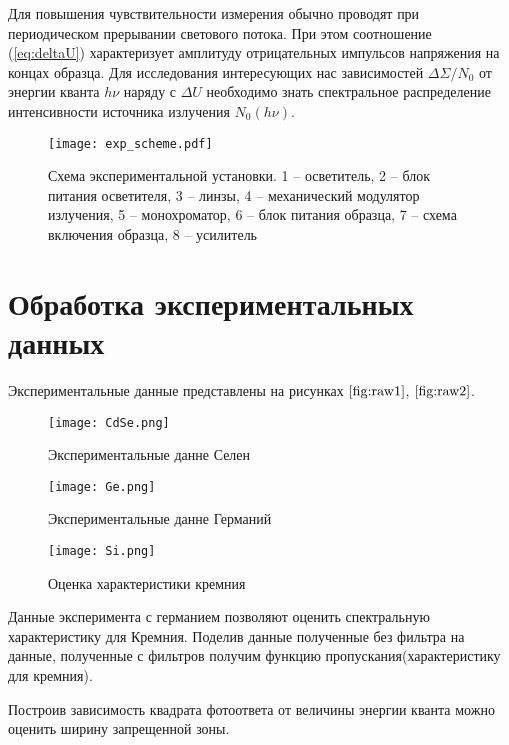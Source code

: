 \documentclass[a4paper, 14pt]{article}
\begin{document}
    Для повышения чувствительности измерения обычно проводят при периодическом прерывании светового потока. При этом соотношение (\ref{eq:deltaU}) характеризует амплитуду отрицательных импульсов напряжения на концах образца. Для исследования интересующих нас зависимостей $\Delta\Sigma/N_0$ от энергии кванта $h\nu$ наряду с $\Delta U$ необходимо знать спектральное распределение интенсивности источника излучения $N_0(h\nu)$.
    \begin{figure}[!htb]
        \centering
        \texttt{[image: exp\_scheme.pdf]}
        \caption{Схема экспериментальной установки. 1 -- осветитель, 2 -- блок питания осветителя, 3 -- линзы, 4 -- механический модулятор излучения, 5 -- монохроматор, 6 -- блок питания образца, 7 -- схема включения образца, 8 -- усилитель}
    \end{figure}

\newpage
\section*{\textcolor{header}{Обработка экспериментальных данных}}

Экспериментальные данные представлены на рисунках $\ref{fig:raw1}$, $\ref{fig:raw2}$.
\begin{figure}[htbp]
    \centering
    \texttt{[image: CdSe.png]}


    \caption{Экспериментальные данне Селен}
    \label{fig:raw1}
\end{figure}

\begin{figure}[htbp]
    \centering
    \texttt{[image: Ge.png]}
    

    \caption{Экспериментальные данне Германий}
    \label{fig:raw2}
\end{figure}


\begin{figure}[htbp]
    \centering
    \texttt{[image: Si.png]}

    

    \caption{Оценка характеристики кремния}
    \label{fig:Si}
\end{figure}
Данные эксперимента с германием позволяют оценить спектральную характеристику для Кремния.
Поделив данные полученные без фильтра на данные, полученные с фильтров получим функцию пропускания(характеристику для кремния).


Построив зависимость квадрата фотоответа от величины энергии кванта можно оценить ширину запрещенной зоны.
\end{document}
